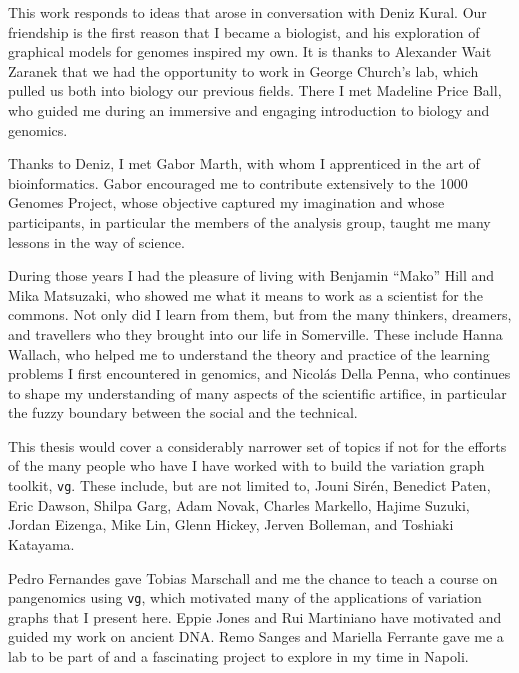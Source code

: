 
\begin{acknowledgements}      

  This work responds to ideas that arose in conversation with Deniz Kural.
  Our friendship is the first reason that I became a biologist, and his exploration of graphical models for genomes inspired my own.
  It is thanks to Alexander Wait Zaranek that we had the opportunity to work in George Church's lab, which pulled us both into biology our previous fields.
  There I met Madeline Price Ball, who guided me during an immersive and engaging introduction to biology and genomics.
  
  Thanks to Deniz, I met Gabor Marth, with whom I apprenticed in the art of bioinformatics.
  Gabor encouraged me to contribute extensively to the 1000 Genomes Project, whose objective captured my imagination and whose participants, in particular the members of the analysis group, taught me many lessons in the way of science.

  During those years I had the pleasure of living with Benjamin ``Mako'' Hill and Mika Matsuzaki, who showed me what it means to work as a scientist for the commons.
  Not only did I learn from them, but from the many thinkers, dreamers, and travellers who they brought into our life in Somerville.
  These include Hanna Wallach, who helped me to understand the theory and practice of the learning problems I first encountered in genomics, and Nicol\'{a}s Della Penna, who continues to shape my understanding of many aspects of the scientific artifice, in particular the fuzzy boundary between the social and the technical.
  
  This thesis would cover a considerably narrower set of topics if not for the efforts of the many people who have I have worked with to build the variation graph toolkit, {\tt vg}.
  These include, but are not limited to,
  Jouni Sir\'{e}n,
  Benedict Paten,
  Eric Dawson,
  Shilpa Garg,
  Adam Novak,
  Charles Markello,
  Hajime Suzuki,
  Jordan Eizenga,
  Mike Lin,
  Glenn Hickey,
  Jerven Bolleman,
  and Toshiaki Katayama.

  Pedro Fernandes gave Tobias Marschall and me the chance to teach a course on pangenomics using {\tt vg}, which motivated many of the applications of variation graphs that I present here.
  Eppie Jones and Rui Martiniano have motivated and guided my work on ancient DNA.
  Remo Sanges and Mariella Ferrante gave me a lab to be part of and a fascinating project to explore in my time in Napoli.
  

\end{acknowledgements}
